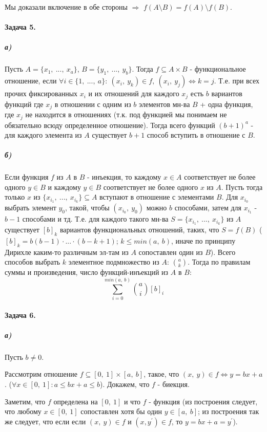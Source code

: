 \documentclass{article}
\begin{document}
		Мы доказали включение в обе стороны $\Rightarrow$ $f(A \setminus B) = f(A) \setminus f(B)$. 
		
		\paragraph{Задача 5.}
		\subparagraph{а)} Пусть $A = \{x_1,\ ...,\ x_a\}$, $B = \{y_1,\ ...,\ y_b\}$. Тогда $f \subseteq A \times B$ - функциональное отношение, если $\forall i \in \{1,\ ...,\ a\}:\ (x_i,\ y_k) \in f,\ (x_i,\ y_j) \Leftrightarrow k = j$. Т.е. при всех прочих фиксированных $x_i$ и их отношений для каждого $x_j$ есть $b$ вариантов функций где $x_j$ в отношении с одним из $b$ элементов мн-ва $B$ + одна функция, где $x_j$ не находится в отношениях (т.к. под функцией мы понимаем не обязательно всюду определенное отношение). Тогда всего функций $(b + 1) ^ {a}$ - для каждого элемента из $A$ существует $b + 1$ способ вступить в отношение с $B$. 
		
		\subparagraph{б)} Если функция $f$ из $A$ в $B$ - инъекция, то каждому $x \in A$ соответствует не более одного $y \in B$ и каждому $y \in B$ соответствует не более одного $x$ из $A$. Пусть тогда только $x$ из $\{x_{i_1},\ ..., \ x_{i_{k}}\} \subseteq A$ вступают в отношение с  элементами $B$. Для $x_{i_0}$ выбрать элемент $y_0$, такой, чтобы $(x_{i_0},\ y_0)$ можно $b$ способами, затем для $x_{i_1}$ - $b - 1$ способами и тд. Т.е. для каждого такого мн-ва $S = \{x_{i_1},\ ..., \ x_{i_{k}}\}$ из $A$ существует $[b]_k$ вариантов функциональных отношений, таких, что $S = f(B)$ ($[b]_k = b(b - 1)\cdot ... \cdot (b - k + 1)$; $k \leqslant min(a,\ b)$, иначе по принципу Дирихле каким-то различным эл-там из $A$ сопоставлен один из $B$). Всего способов выбрать $k$ элементное подмножество из $A$: ${a \choose k}$. Тогда по правилам суммы и произведения, число функций-инъекций из $A$ в $B$:
		$$\sum_{i = 0}^{min(a,\ b)} {a \choose i}[b]_i$$
		
		\paragraph{Задача 6.} 
		\subparagraph{а)}  Пусть $b \ne 0$. 
		
		Рассмотрим отношение $f \subseteq [0,\ 1] \times [a,\ b]$, такое, что $(x,\ y) \in f \Leftrightarrow y = bx +  a$. ($\forall x \in [0,\ 1]: a \leqslant bx + a \leqslant b$). Докажем, что $f$ - биекция. 
		
		Заметим, что $f$ определена на $[0,\ 1]$ и что $f$ - функция (из построения следует, что любому $x \in [0,\ 1]$ сопоставлен хотя бы один $y \in [a,\ b]$; из построения так же следует, что если  если $(x,\ y) \in f$ и $(x, y^{\prime}) \in f$, то $y = bx + a = y^{\prime}$).
		
\end{document}
